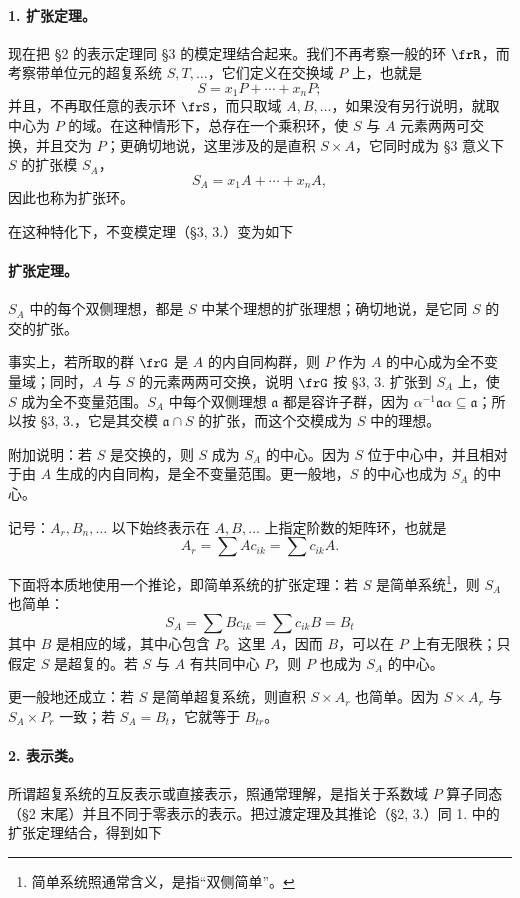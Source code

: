 \paragraph{1. 扩张定理。}
现在把 §2 的表示定理同 §3 的模定理结合起来。我们不再考察一般的环 \(\frR\)，而考察带单位元的超复系统 \(S,T,\ldots\)，它们定义在交换域 \(P\) 上，也就是
\[
        S=x_1P+\cdots+x_nP;
\]
并且，不再取任意的表示环 \(\frS\)，而只取域 \(A,B,\ldots\)，如果没有另行说明，就取中心为 \(P\) 的域。在这种情形下，总存在一个乘积环，使 \(S\) 与 \(A\) 元素两两可交换，并且交为 \(P\)；更确切地说，这里涉及的是直积 \(S\times A\)，它同时成为 §3 意义下 \(S\) 的扩张模 \(S_A\)，
\[
        S_A=x_1A+\cdots+x_nA,
\]
因此也称为扩张环。

在这种特化下，不变模定理（§3, 3.）变为如下

\paragraph{扩张定理。}
\(S_A\) 中的每个双侧理想，都是 \(S\) 中某个理想的扩张理想；确切地说，是它同 \(S\) 的交的扩张。

事实上，若所取的群 \(\frG\) 是 \(A\) 的内自同构群，则 \(P\) 作为 \(A\) 的中心成为全不变量域；同时，\(A\) 与 \(S\) 的元素两两可交换，说明 \(\frG\) 按 §3, 3. 扩张到 \(S_A\) 上，使 \(S\) 成为全不变量范围。\(S_A\) 中每个双侧理想 \(\mathfrak a\) 都是容许子群，因为 \(\alpha^{-1}\mathfrak a\alpha\subseteq\mathfrak a\)；所以按 §3, 3.，它是其交模 \(\mathfrak a\cap S\) 的扩张，而这个交模成为 \(S\) 中的理想。

附加说明：若 \(S\) 是交换的，则 \(S\) 成为 \(S_A\) 的中心。因为 \(S\) 位于中心中，并且相对于由 \(A\) 生成的内自同构，是全不变量范围。更一般地，\(S\) 的中心也成为 \(S_A\) 的中心。

记号：\(A_r,B_n,\ldots\) 以下始终表示在 \(A,B,\ldots\) 上指定阶数的矩阵环，也就是
\[
        A_r=\sum A c_{ik}=\sum c_{ik}A.
\]

下面将本质地使用一个推论，即简单系统的扩张定理：若 \(S\) 是简单系统\footnote{简单系统照通常含义，是指“双侧简单”。}，则 \(S_A\) 也简单：
\[
        S_A=\sum B c_{ik}=\sum c_{ik}B=B_t
\]
其中 \(B\) 是相应的域，其中心包含 \(P\)。这里 \(A\)，因而 \(B\)，可以在 \(P\) 上有无限秩；只假定 \(S\) 是超复的。若 \(S\) 与 \(A\) 有共同中心 \(P\)，则 \(P\) 也成为 \(S_A\) 的中心。

更一般地还成立：若 \(S\) 是简单超复系统，则直积 \(S\times A_r\) 也简单。因为 \(S\times A_r\) 与 \(S_A\times P_r\) 一致；若 \(S_A=B_t\)，它就等于 \(B_{tr}\)。

\paragraph{2. 表示类。}
所谓超复系统的互反表示或直接表示，照通常理解，是指关于系数域 \(P\) 算子同态（§2 末尾）并且不同于零表示的表示。把过渡定理及其推论（§2, 3.）同 1. 中的扩张定理结合，得到如下


